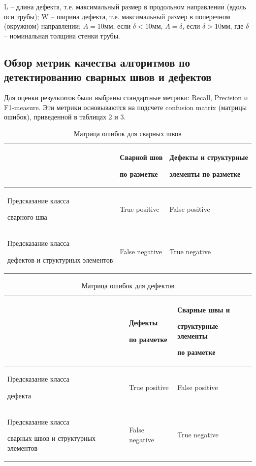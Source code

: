 \documentclass[a4paper,article,14pt]{extarticle}
\begin{document}
L – длина дефекта, т.е. максимальный размер в продольном направлении (вдоль оси трубы);
W – ширина дефекта, т.е. максимальный размер в поперечном (окружном) направлении;
$A = 10 мм$, если $\delta < 10 мм$, $A = \delta$, если $\delta > 10 мм$, где $\delta$ – номинальная толщина стенки трубы.

\subsection{Обзор метрик качества алгоритмов по детектированию сварных швов и дефектов}

Для оценки результатов были выбраны стандартные метрики: Recall,  Precision и F1-measure.
Эти метрики основываются на подсчете confusion matrix (матрицы ошибок), приведенной в таблицах 2 и 3.

\begin{center}
\begin{longtable}{|p{5cm}|p{3cm}|p{6cm}|} %
    \caption{Матрица ошибок для сварных швов}\\\hline
     & Сварной шов \par по разметке & Дефекты и структурные \par элементы по разметке \\ \hline
    Предсказание класса\par сварного шва & True positive & False positive \\ \hline
    Предсказание класса \par дефектов и структурных элементов & False negative & True negative \\ \hline
\end{longtable}
\end{center}

\pagebreak

\begin{center}
\begin{longtable}{|p{5cm}|p{3cm}|p{6cm}|} %
    \caption{Матрица ошибок для дефектов}\\\hline
        & Дефекты \par по разметке & Сварные швы и \par структурные элементы \par по разметке \\ \hline
    Предсказание класса\par дефекта & True positive & False positive \\ \hline
    Предсказание класса \par сварных швов и структурных элементов & False negative & True negative \\ \hline
\end{longtable}
\end{center}
\end{document}
